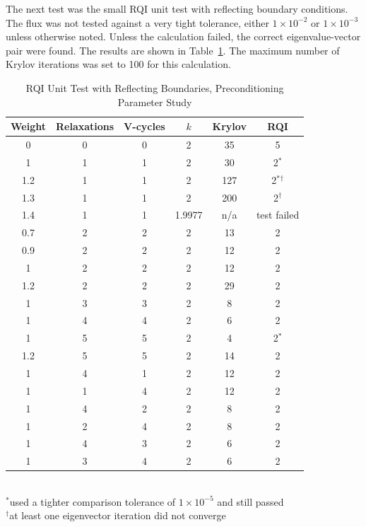 The next test was the small RQI unit test with reflecting boundary conditions. The flux was not tested against a very tight tolerance, either $1 \times 10^{-2}$ or $1 \times 10^{-3}$ unless otherwise noted. Unless the calculation failed, the correct eigenvalue-vector pair were found. The results are shown in Table~\ref{table:RQIUnitTestRefl}. The maximum number of Krylov iterations was set to 100 for this calculation.
%
\begin{table}[!h]
\caption{RQI Unit Test with Reflecting Boundaries, Preconditioning Parameter Study}
\begin{center}
\begin{tabular}{c c c c c c}
\hline
Weight & Relaxations & V-cycles & $k$ & Krylov & RQI \\[0.5ex]
\hline
0    & 0 & 0 & 2 & 35   & 5 \\
1    & 1 & 1 & 2 & 30   & 2$^{*}$ \\
1.2 & 1 & 1 & 2 & 127 & 2$^{*}$$^{\dag}$ \\
1.3 & 1 & 1 & 2 & 200 & 2$^{\dag}$ \\
1.4 & 1 & 1 & 1.9977  & n/a & test failed \\
\hline
0.7 & 2 & 2 & 2 & 13   & 2 \\
0.9 & 2 & 2 & 2 & 12   & 2 \\
1    & 2 & 2 & 2 & 12   & 2 \\
1.2 & 2 & 2 & 2 & 29   & 2 \\
\hline
1    & 3 & 3 & 2 & 8     & 2 \\
1    & 4 & 4 & 2 & 6     & 2 \\
1    & 5 & 5 & 2 & 4     & 2$^{*}$ \\
1.2 & 5 & 5 & 2 & 14   & 2 \\
\hline
1    & 4 & 1 & 2 & 12   & 2 \\
1    & 1 & 4 & 2 & 12   & 2 \\
1    & 4 & 2 & 2 & 8     & 2 \\
1    & 2 & 4 & 2 & 8     & 2 \\
1    & 4 & 3 & 2 & 6     & 2 \\
1    & 3 & 4 & 2 & 6     & 2 \\
\hline 
\end{tabular}\\
$^{*}$used a tighter comparison tolerance of $1 \times 10^{-5}$ and still passed\\
$^{\dag}$at least one eigenvector iteration did not converge
\end{center}
\label{table:RQIUnitTestRefl}
\end{table}

